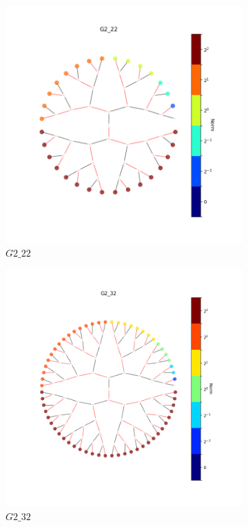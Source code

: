 \begin{figure}
	\begin{subfigure}{.5\textwidth}
		\centering
		\includegraphics[width=.8\linewidth]{img/G2_22}
		\caption{$\mathit{G2\_22}$}
		\label{fig:sfig1}
	\end{subfigure}%
	\begin{subfigure}{.5\textwidth}
		\centering
		\includegraphics[width=.8\linewidth]{img/G2_32}
		\caption{$\mathit{G2\_32}$}
		\label{fig:sfig2}
	\end{subfigure}
	\begin{subfigure}{.5\textwidth}
		\centering

\end{subfigure}
\end{figure}
